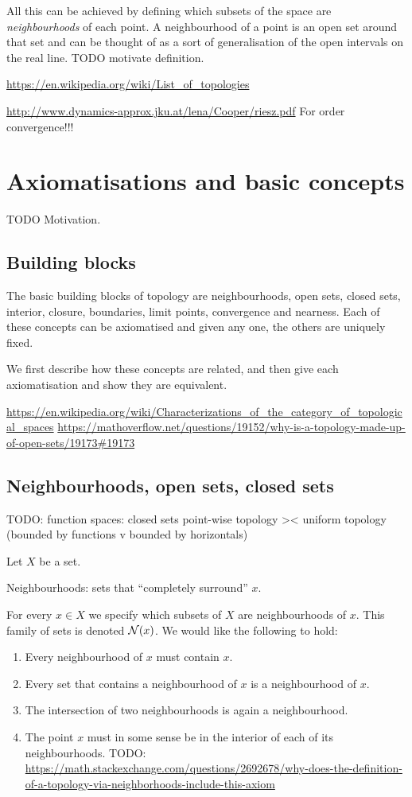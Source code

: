 All this can be achieved by defining which subsets of the space are \textit{neighbourhoods} of each point. A neighbourhood of a point is an open set around that set and can be thought of as a sort of generalisation of the open intervals on the real line. TODO motivate definition.

\url{https://en.wikipedia.org/wiki/List_of_topologies}

\url{http://www.dynamics-approx.jku.at/lena/Cooper/riesz.pdf} For order convergence!!!

\section{Axiomatisations and basic concepts}
TODO Motivation.
\subsection{Building blocks}
The basic building blocks of topology are neighbourhoods, open sets, closed sets, interior, closure, boundaries, limit points, convergence and nearness. Each of these concepts can be axiomatised and given any one, the others are uniquely fixed.

We first describe how these concepts are related, and then give each axiomatisation and show they are equivalent.

\url{https://en.wikipedia.org/wiki/Characterizations_of_the_category_of_topological_spaces} 
\url{https://mathoverflow.net/questions/19152/why-is-a-topology-made-up-of-open-sets/19173#19173}

\subsection{Neighbourhoods, open sets, closed sets}
TODO: function spaces: closed sets point-wise topology >< uniform topology (bounded by functions v bounded by horizontals)

Let $X$ be a set.

Neighbourhoods: sets that ``completely surround'' $x$.

For every $x\in X$ we specify which subsets of $X$ are neighbourhoods of $x$. This family of sets is denoted $\operatorname{\mathcal{N}}(x)$. We would like the following to hold:
\begin{enumerate}
\item Every neighbourhood of $x$ must contain $x$.
\item Every set that contains a neighbourhood of $x$ is a neighbourhood of $x$.
\item The intersection of two neighbourhoods is again a neighbourhood.
\item The point $x$ must in some sense be in the interior of each of its neighbourhoods. TODO: \url{https://math.stackexchange.com/questions/2692678/why-does-the-definition-of-a-topology-via-neighborhoods-include-this-axiom}
\end{enumerate}

